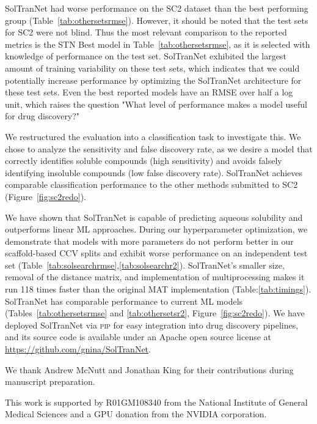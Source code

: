 \documentclass[journal=jmcmar,manuscript=article]{achemso}
\begin{document}
SolTranNet had worse performance on the SC2 dataset than the best performing group (Table~\ref{tab:othersetsrmse}).
However, it should be noted that the test sets for SC2 were not blind.
Thus the most relevant comparison to the reported metrics is the STN Best model in Table~\ref{tab:othersetsrmse}, as it is selected with knowledge of performance on the test set.
SolTranNet exhibited the largest amount of training variability on these test sets, which indicates that we could potentially increase performance by optimizing the SolTranNet architecture for these test sets.
Even the best reported models have an RMSE over half a log unit, which raises the question "What level of performance makes a model useful for drug discovery?"

We restructured the evaluation into a classification task to investigate this. 
We chose to analyze the sensitivity and false discovery rate, as we desire a model that correctly identifies soluble compounds (high sensitivity) and avoids falsely identifying insoluble compounds (low false discovery rate).
SolTranNet achieves comparable classification performance to the other methods submitted to SC2 (Figure~\ref{fig:sc2redo}).

We have shown that SolTranNet is capable of predicting aqueous solubility and outperforms linear ML approaches.
During our hyperparameter optimization, we demonstrate that models with more parameters do not perform better in our scaffold-based CCV splits and exhibit worse performance on an independent test set (Table~\ref{tab:solsearchrmse},\ref{tab:solsearchr2}).
SolTranNet's smaller size, removal of the distance matrix, and implementation of multiprocessing makes it run 118 times faster than the original MAT implementation (Table:\ref{tab:timings}).
SolTranNet has comparable performance to current ML models (Tables~\ref{tab:othersetsrmse} and \ref{tab:othersetsr2}, Figure~\ref{fig:sc2redo}).
We have deployed SolTranNet via \textsc{pip} for easy integration into drug discovery pipelines, and its source code is available under an Apache open source license at \url{https://github.com/gnina/SolTranNet}.

\begin{acknowledgement}

We thank Andrew McNutt and Jonathan King for their contributions during manuscript preparation.

This work is supported by R01GM108340 from the National Institute of General Medical Sciences and a GPU donation from the NVIDIA corporation.

\end{acknowledgement}
\end{document}
